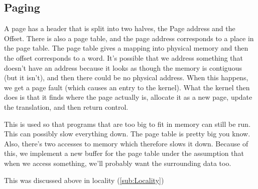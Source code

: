 \documentclass[11pt,a4paper,titlepage,dvipsnames,cmyk]{scrartcl}
\begin{document}
\subsection{Paging}%
\label{sub:Paging}
A page has a header that is split into two halves, the Page address and the
Offset. There is also a page table, and the page address corresponds to a
place in the page table. The page table gives a mapping into physical
memory and then the offset corresponds to a word. It's possible that we
address something that doesn't have an address because it looks as though
the memory is contiguous (but it isn't), and then there could be no
physical address. When this happens, we get a page fault (which causes an
entry to the kernel). What the kernel then does is that it finds where the
page actually is, allocate it as a new page, update the translation, and
then return control.

This is used so that programs that are too big to fit in memory can still
be run. This can possibly slow everything down. The page table is pretty
big you know. Also, there's two accesses to memory which therefore slows
it down. Because of this, we implement a new buffer for the page table
under the assumption that when we access something, we'll probably want
the surrounding data too.

This was discussed above in locality (\ref{sub:Locality})
\end{document}
